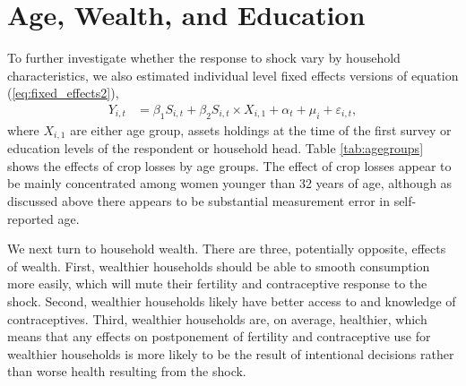 \documentclass[letterpaper,12pt]{article}
\begin{document}



















\clearpage
\section{Age, Wealth, and Education}

To further investigate whether the response to shock vary by household
characteristics, we also estimated individual level fixed effects versions 
of equation (\ref{eq:fixed_effects2}),
\begin{align}
Y_{i,t} &=  \beta_1 S_{i,t}  +  \beta_2 S_{i,t} \times X_{i,1} +
\alpha_{t} + \mu_i + \varepsilon_{i,t},   
\label{eq:fixed_effects2} 
\end{align}
where $X_{i,1}$ are either age group, assets holdings at the time of 
the first survey or education levels of the respondent or household head.
Table \ref{tab:agegroups} shows the effects of crop losses by age groups.
The effect of crop losses appear to be mainly concentrated among women 
younger than 32 years of age, although as discussed above there appears 
to be substantial measurement error in self-reported age.




We next turn to household wealth.
There are three, potentially opposite, effects of wealth.
First,
wealthier households should be able to smooth consumption more easily,
which will mute their fertility and contraceptive response to the shock.
Second, 
wealthier households likely have better access to and knowledge
of contraceptives.
Third, 
wealthier households are, on average, healthier, which means that any 
effects on postponement of fertility and contraceptive use for wealthier
households is more likely to be the result of intentional decisions 
rather than worse health resulting from the shock.
\end{document}
